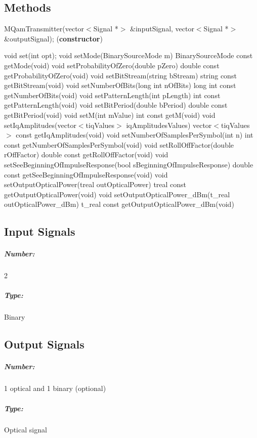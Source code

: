\pagebreak

\subsection*{Methods}

MQamTransmitter(vector$<$Signal *$>$ \&inputSignal, vector$<$Signal *$>$ \&outputSignal); (\textbf{constructor})
\bigbreak

void set(int opt);
\bigbreak
void setMode(BinarySourceMode m)
\bigbreak
BinarySourceMode const getMode(void)
\bigbreak
void setProbabilityOfZero(double pZero)
\bigbreak
double const getProbabilityOfZero(void)
\bigbreak
void setBitStream(string bStream)
\bigbreak
string const getBitStream(void)
\bigbreak
void setNumberOfBits(long int nOfBits)
\bigbreak
long int const getNumberOfBits(void)
\bigbreak
void setPatternLength(int pLength)
\bigbreak
int const getPatternLength(void)
\bigbreak
void setBitPeriod(double bPeriod)
\bigbreak
double const getBitPeriod(void)
\bigbreak
void setM(int mValue)
int const getM(void)
\bigbreak
void setIqAmplitudes(vector$<$t\textunderscore iqValues$>$ iqAmplitudesValues)
\bigbreak
vector$<$t\textunderscore iqValues$>$ const getIqAmplitudes(void)
\bigbreak
void setNumberOfSamplesPerSymbol(int n)
\bigbreak
int const getNumberOfSamplesPerSymbol(void)
\bigbreak
void setRollOffFactor(double rOffFactor)
\bigbreak
double const getRollOffFactor(void)
\bigbreak
void setSeeBeginningOfImpulseResponse(bool sBeginningOfImpulseResponse)
\bigbreak
double const getSeeBeginningOfImpulseResponse(void)
\bigbreak
void setOutputOpticalPower(t\textunderscore real outOpticalPower)
\bigbreak
t\textunderscore real const getOutputOpticalPower(void)
\bigbreak
void setOutputOpticalPower\_dBm(t\_real outOpticalPower\_dBm)
\bigbreak
t\_real const getOutputOpticalPower\_dBm(void)
\pagebreak

\subsection*{Input Signals}
\subparagraph*{Number:} 2

\subparagraph*{Type:} Binary

\subsection*{Output Signals}

\subparagraph*{Number:} 1 optical and 1 binary (optional)

\subparagraph*{Type:} Optical signal

